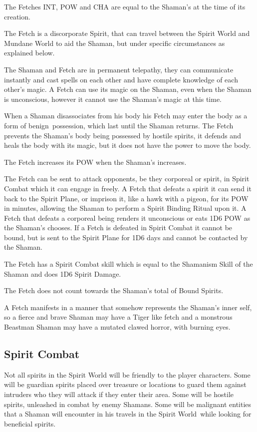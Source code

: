 \begin{rpg-list}
\item The Fetches INT, POW and CHA are equal to the Shaman’s at the time of its creation.
\item The Fetch is a discorporate Spirit, that can travel between the Spirit World and Mundane World to aid the Shaman, but under specific circumstances as explained below.
\item The Shaman and Fetch are in permanent telepathy, they can communicate instantly and cast spells on each other and have complete knowledge of each other’s magic. A Fetch can use its magic on the Shaman, even when the Shaman is unconscious, however it cannot use the Shaman’s magic at this time.
\item When a Shaman disassociates from his body his Fetch may enter the body as a form of benign possession, which last until the Shaman returns. The Fetch prevents the Shaman’s body being possessed by hostile spirits, it defends and heals the body with its magic, but it does not have the power to move the body.
\item The Fetch increases its POW when the Shaman’s increases.
\item The Fetch can be sent to attack opponents, be they corporeal or spirit, in Spirit Combat which it can engage in freely. A Fetch that defeats a spirit it can send it back to the Spirit Plane, or imprison it, like a hawk with a pigeon, for its POW in minutes, allowing the Shaman to perform a Spirit Binding Ritual upon it. A Fetch that defeats a corporeal being renders it unconscious or eats 1D6 POW as the Shaman’s chooses. If a Fetch is defeated in Spirit Combat it cannot be bound, but is sent to the Spirit Plane for 1D6 days and cannot be contacted by the Shaman.
\item The Fetch has a Spirit Combat skill which is equal to the Shamanism Skill of the Shaman and does 1D6 Spirit Damage.
\item The Fetch does not count towards the Shaman’s total of Bound Spirits.
\item A Fetch manifests in a manner that somehow represents the Shaman’s inner self, so a fierce and brave Shaman may have a Tiger like fetch and a monstrous Beastman Shaman may have a mutated clawed horror, with burning eyes.
\end{rpg-list}


\subsection{Spirit Combat}
\label{ssec:spirit-combat}
Not all spirits in the Spirit World will be friendly to the player characters. Some will be guardian spirits placed over treasure or locations to guard them against intruders who they will attack if they enter their area. Some will be hostile spirits, unleashed in combat by enemy Shamans. Some will be malignant entities that a Shaman will encounter in his travels in the Spirit World while looking for beneficial spirits.

